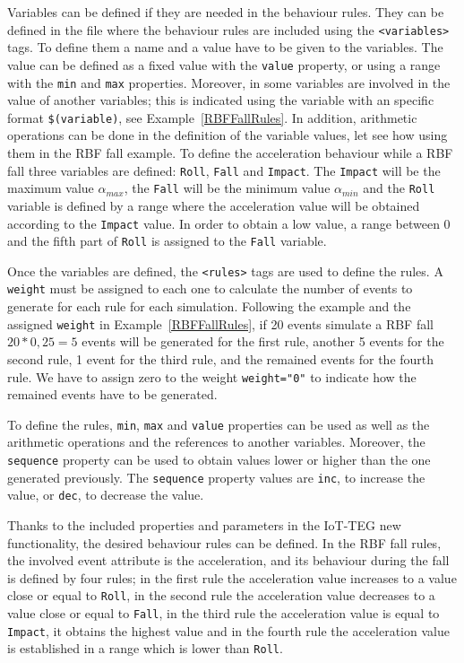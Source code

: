 \documentclass[conference]{IEEEtran}
\theoremstyle{definition}
\begin{document}
Variables can be defined if they are needed in the behaviour rules. They can be defined in the file where
the behaviour rules are included using the \texttt{<variables>} tags. To define them a name and a value 
have to be given to the variables. The value can be defined as a fixed value with the \texttt{value} 
property, or using a range with the \texttt{min} and \texttt{max} properties. Moreover, in some variables
are involved in the value of another variables; this is indicated using the variable with an specific 
format \texttt{\$(variable)}, see Example~\ref{RBFFallRules}. In addition, arithmetic operations can be done in the 
definition of the variable values, let see how using them in the RBF fall example. To define the acceleration behaviour
while a RBF fall three variables are defined: \texttt{Roll}, \texttt{Fall} and \texttt{Impact}. The \texttt{Impact}
will be the maximum value $\alpha_{max}$, the \texttt{Fall} will be the minimum value $\alpha_{min}$ and the 
\texttt{Roll} variable is defined by a range where the acceleration value will be obtained according to the 
\texttt{Impact} value. In order to obtain a low value, a range between 0 and the fifth part of \texttt{Roll} is
assigned to the \texttt{Fall} variable.

Once the variables are defined, the \texttt{<rules>} tags are used to define the rules. A \texttt{weight}
must be assigned to each one to calculate the number of events to generate for each rule for each simulation.
Following the example and the assigned \texttt{weight} in Example~\ref{RBFFallRules}, if 20 events simulate 
a RBF fall $20 * 0,25 = 5$ events will be generated for the first rule, another 5 events for the second rule,
1 event for the third rule, and the remained events for the fourth rule. We have to assign zero to the weight
\texttt{weight="0"} to indicate how the remained events have to be generated.

To define the rules, \texttt{min}, \texttt{max} and \texttt{value} properties can be used as well as the arithmetic 
operations and the references to another variables. Moreover, the \texttt{sequence} property can be used to obtain
values lower or higher than the one generated previously. The \texttt{sequence} property values are \texttt{inc}, 
to increase the value, or \texttt{dec}, to decrease the value.

Thanks to the included properties and parameters in the IoT-TEG new functionality, the desired behaviour rules can
be defined. In the RBF fall rules, the involved event attribute is the acceleration, and its behaviour during the 
fall is defined by four rules; in the first rule the acceleration value increases to a value close or equal to \texttt{Roll},
in the second rule the acceleration value decreases to a value close or equal to \texttt{Fall}, in the third rule the 
acceleration value is equal to \texttt{Impact}, it obtains the highest value and in the fourth rule the acceleration value
is established in a range which is lower than \texttt{Roll}.
\end{document}

